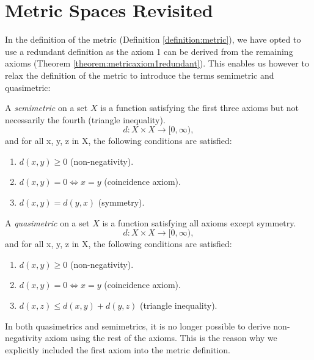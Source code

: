 \section{Metric Spaces Revisited}
\label{section:semimetricRepairment}
In the definition of the metric (Definition \ref{definition:metric}), we have opted to use a redundant definition as the axiom 1 can be derived from the remaining axioms (Theorem \ref{theorem:metricaxiom1redundant}). This enables us however to relax the definition of the metric to introduce the terms semimetric and quasimetric:

\begin{definition}
	A \emph{semimetric} on a set $X$ is a function satisfying the first three axioms but not necessarily the fourth (triangle inequality).
	\begin{equation}
	d : X \times X \rightarrow [0,\infty),
	\end{equation}
	and for all x, y, z in X, the following conditions are satisfied:
	\begin{enumerate}
		\item $d(x,y) \geq 0$ (non-negativity).
		\item $d(x,y) = 0 \Leftrightarrow x = y$ (coincidence axiom).
		\item $d(x,y) = d(y,x)$ (symmetry).
	\end{enumerate}	
\end{definition}
\begin{definition}
	A \emph{quasimetric} on a set $X$ is a function satisfying all axioms except symmetry.
	\begin{equation}
	d : X \times X \rightarrow [0,\infty),
	\end{equation}
	and for all x, y, z in X, the following conditions are satisfied:
	\begin{enumerate}
		\item $d(x,y) \geq 0$ (non-negativity).
		\item $d(x,y) = 0 \Leftrightarrow x = y$ (coincidence axiom).
		\item $d(x,z) \leq d(x,y) + d(y,z)$ (triangle inequality).
	\end{enumerate}	
\end{definition}
In both quasimetrics and semimetrics, it is no longer possible to derive non-negativity axiom using the rest of the axioms. This is the reason why we explicitly included the first axiom into the metric definition. 

